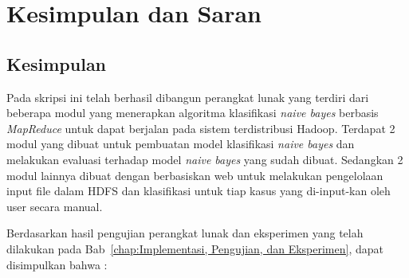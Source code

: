 \chapter{Kesimpulan dan Saran}

\section{Kesimpulan}

Pada skripsi ini telah berhasil dibangun perangkat lunak yang terdiri dari beberapa modul yang menerapkan algoritma klasifikasi \textit{naive bayes} berbasis \textit{MapReduce} untuk dapat berjalan pada sistem terdistribusi Hadoop. Terdapat 2 modul yang dibuat untuk pembuatan model klasifikasi \textit{naive bayes} dan melakukan evaluasi terhadap model \textit{naive bayes} yang sudah dibuat. Sedangkan 2 modul lainnya dibuat dengan berbasiskan web untuk melakukan pengelolaan input file dalam HDFS dan klasifikasi untuk tiap kasus yang di-input-kan oleh user secara manual.


Berdasarkan hasil pengujian perangkat lunak dan eksperimen yang telah dilakukan pada Bab~\ref{chap:Implementasi, Pengujian, dan Eksperimen}, dapat disimpulkan bahwa :

